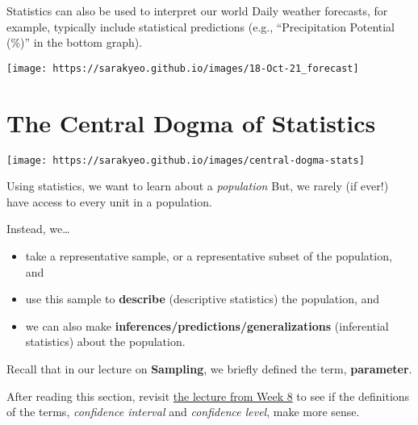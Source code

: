 \documentclass[
  ignorenonframetext,
]{beamer}
\providecommand{\tightlist}{%
  \setlength{\itemsep}{0pt}\setlength{\parskip}{0pt}}
\begin{document}
\begin{frame}{Statistics can also be used to interpret our world}
\protect\hypertarget{statistics-can-also-be-used-to-interpret-our-world}{}
Daily weather forecasts, for example, typically include statistical
predictions (e.g., ``Precipitation Potential (\%)'' in the bottom
graph).

\begin{center}\texttt{[image: https://sarakyeo.github.io/images/18-Oct-21\_forecast]} \end{center}
\end{frame}

\hypertarget{the-central-dogma-of-statistics}{%
\section{The Central Dogma of
Statistics}\label{the-central-dogma-of-statistics}}

\begin{frame}{}
\protect\hypertarget{section-6}{}
\begin{center}\texttt{[image: https://sarakyeo.github.io/images/central-dogma-stats]} \end{center}
\end{frame}

\begin{frame}{Using statistics, we want to learn about a
\emph{population}}
\protect\hypertarget{using-statistics-we-want-to-learn-about-a-population}{}
But, we rarely (if ever!) have access to every unit in a population.

Instead, we\ldots{}

\begin{itemize}[<+->]
\tightlist
\item
  take a representative sample, or a representative subset of the
  population, and
\item
  use this sample to \textbf{describe} (descriptive statistics) the
  population, and
\item
  we can also make \textbf{inferences/predictions/generalizations}
  (inferential statistics) about the population.
\end{itemize}
\end{frame}

\begin{frame}{}
\protect\hypertarget{section-7}{}
Recall that in our lecture on \textbf{Sampling}, we briefly defined the
term, \textbf{parameter}.

After reading this section, revisit
\href{https://sarakyeo.github.io/COMM-3710/week8.html}{the lecture from
Week 8} to see if the definitions of the terms, \emph{confidence
interval} and \emph{confidence level}, make more sense.
\end{frame}
\end{document}
